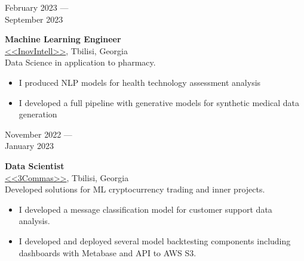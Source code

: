 \documentclass[10pt,a4paper]{article}
\newcommand{\lmpratio}{0.15}
\newcommand{\rmpratio}{0.74}
\newcommand{\vSpace}{0.5cm}
\newcommand{\horizontalSpace}{0.05\textwidth}
\newcommand{\sectionMain}[1]{\textbf{#1}}
\begin{document}
	\begin{minipage}[t]{\lmpratio\textwidth}
		February 2023 --- \\September 2023
	\end{minipage}
	\hspace{\horizontalSpace}
	\begin{minipage}[t]{\rmpratio\textwidth}
		\sectionMain{Machine Learning Engineer}\\
		\href{https://www.inovintell.com/}{<<InovIntell>>}, Tbilisi, Georgia\\[0.1cm]	

Data Science in application to pharmacy. 

\begin{itemize}
    \item I produced NLP models for health technology assessment analysis
    \item I developed a full pipeline with generative models for synthetic medical data generation
\end{itemize}


	\end{minipage}	
	\vspace{\vSpace}


	\begin{minipage}[t]{\lmpratio\textwidth}
		November 2022 --- \\January 2023
	\end{minipage}
	\hspace{\horizontalSpace}
	\begin{minipage}[t]{\rmpratio\textwidth}
		\sectionMain{Data Scientist}\\
		\href{https://3commas.io/}{<<3Commas>>}, Tbilisi, Georgia\\[0.1cm]		

Developed solutions for ML cryptocurrency trading and inner projects.

		\begin{itemize}
                \item 
I developed a message classification model for customer support data analysis.

			\item 
I developed and deployed several model backtesting components including dashboards with Metabase and API to AWS S3.
		\end{itemize}
		
	\end{minipage}	
	\vspace{\vSpace}
\end{document}

